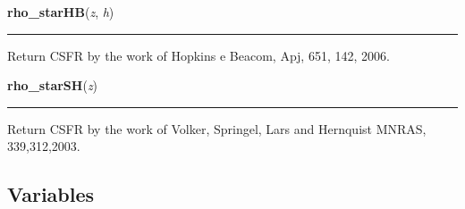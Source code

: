     \label{pycosmicstar:csfrfromfit:rho_starHB}

    \vspace{0.5ex}

\hspace{.8\funcindent}\begin{boxedminipage}{\funcwidth}

    \raggedright \textbf{rho\_starHB}(\textit{z}, \textit{h})

    \vspace{-1.5ex}

    \rule{\textwidth}{0.5\fboxrule}
\setlength{\parskip}{2ex}
    Return CSFR by the work of Hopkins e Beacom, Apj, 651, 142, 2006.

\setlength{\parskip}{1ex}
    \end{boxedminipage}

    \label{pycosmicstar:csfrfromfit:rho_starSH}

    \vspace{0.5ex}

\hspace{.8\funcindent}\begin{boxedminipage}{\funcwidth}

    \raggedright \textbf{rho\_starSH}(\textit{z})

    \vspace{-1.5ex}

    \rule{\textwidth}{0.5\fboxrule}
\setlength{\parskip}{2ex}
    Return CSFR by the work of Volker, Springel, Lars and Hernquist MNRAS, 
    339,312,2003.

\setlength{\parskip}{1ex}
    \end{boxedminipage}



  \subsection{Variables}


